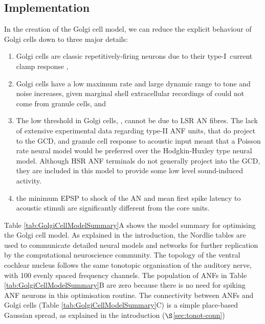 \subsection{Implementation}

 In the creation of the Golgi cell model, we can reduce the explicit behaviour
 of Golgi cells down to three major details:
 \begin{enumerate}
 \item Golgi cells are classic repetitively-firing neurons due to their
   type-I~current clamp response \citep{FerragamoGoldingEtAl:1998},
 \item Golgi cells have a low maximum rate and large dynamic range to tone and
   noise increases, given marginal shell extracellular recordings of
   \citet{GhoshalKim:1997} could not come from granule cells, and
 \item The low threshold in Golgi cells, \citet{GhoshalKim:1997}, cannot be due
   to LSR AN fibres. The lack of extensive experimental data regarding type-II
   ANF units, that do project to the GCD, and granule cell response to acoustic
   input meant that a Poisson rate neural model would be preferred over the
   Hodgkin-Huxley type neural model.  Although HSR ANF terminals do not
   generally project into the GCD, they are included in this model to provide
   some low level sound-induced activity.
 \item the minimum EPSP to shock of the AN \citep{FerragamoGoldingEtAl:1998} and
   mean first spike latency to acoustic stimuli \citep{GhoshalKim:1997} are
   significantly different from the core \VCN units.
 \end{enumerate}

 Table \ref{tab:GolgiCellModelSummary}A shows the model summary for optimising
 the Golgi cell model. As explained in the introduction, the Nordlie tables are
 used to communicate detailed neural models and networks for further replication
 by the computational neuroscience community. The topology of the ventral
 cochlear nucleus follows the same tonotopic organisation of the auditory nerve,
 with 100 evenly spaced frequency channels. The population of ANFs in Table
 \ref{tab:GolgiCellModelSummary}B are zero because there is no need for spiking
 ANF neurons in this optimisation routine.  The connectivity between ANFs and
 Golgi cells (Table \ref{tab:GolgiCellModelSummary}C) is a simple place-based
 Gaussian spread, as explained in the introduction ($\S$\ref{sec:tonot-conn})

